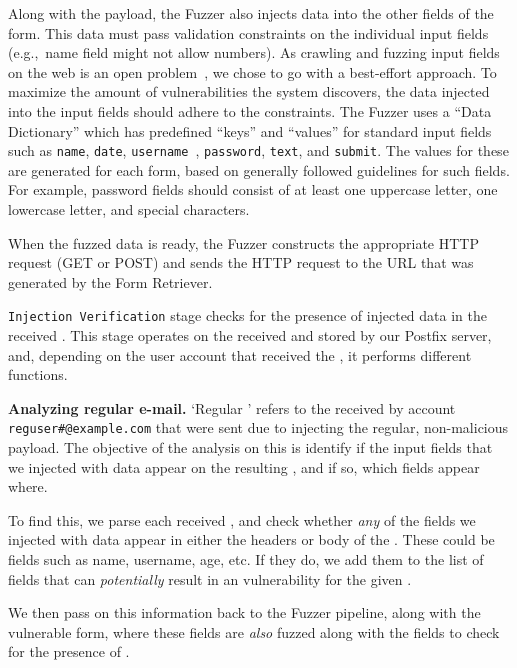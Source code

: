 Along with the payload, the Fuzzer also injects data into the other fields of the form. This data must pass validation constraints on the individual input fields (e.g.,\ name field might not allow numbers).  As crawling and fuzzing input fields on the web is an open problem~\cite{raghavan2000crawling}, we chose to go with a best-effort approach. To maximize the amount of vulnerabilities the system discovers, the data injected into the input fields should adhere to the constraints. The Fuzzer uses a ``Data Dictionary'' which has predefined ``keys'' and ``values'' for standard input fields such as \lstinline{name}, \lstinline{date}, \lstinline{username}~, \lstinline{password}, \lstinline{text}, and \lstinline{submit}.
The values for these are generated for each form, based on generally followed guidelines for such fields. For example, password fields should consist of at least one uppercase letter, one lowercase letter, and special characters.

When the fuzzed data is ready, the Fuzzer constructs the appropriate HTTP request (GET or POST) and sends the HTTP request to the URL that was generated by the \Email Form Retriever.


\lstinline{Injection Verification} stage checks for the presence of injected data in the received \emails. This stage operates on the \emails received and stored by our Postfix server, and, depending on the user account that received the \email, it performs different functions.

\noindent\textbf{Analyzing regular e-mail.}
\sloppy
`Regular \email' refers to the \emails received by account {\lstinline{reguser#@example.com}} that were sent due to injecting the regular, non-malicious payload. The objective of the analysis on this \email is identify if the input fields that we injected with data appear on the resulting \email, and if so, which fields appear where.

To find this, we parse each received \email, and check whether \emph{any} of the fields we injected with data appear in either the headers or body of the \email. These could be fields such as name, username, age, etc. If they do, we add them to the list of fields that can \emph{potentially} result in an \ehi vulnerability for the given \email. 

We then pass on this information back to the Fuzzer pipeline, along with the vulnerable form, where these fields are \emph{also} fuzzed along with the \email fields to check for the presence of \ehi.

